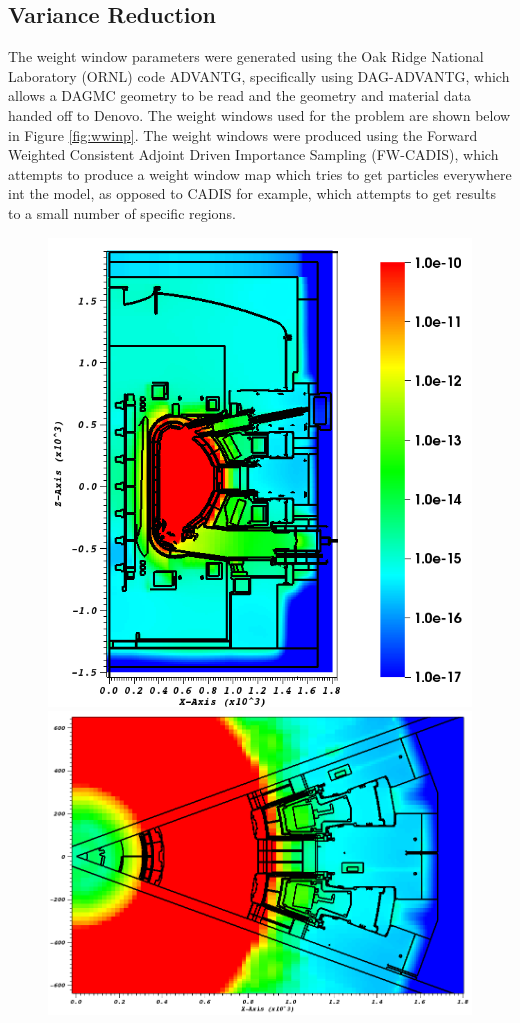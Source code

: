 \documentclass[12pt]{article}
\begin{document}
\subsection{Variance Reduction}
The weight window parameters were generated using the Oak Ridge National Laboratory (ORNL) code ADVANTG, specifically using DAG-ADVANTG, which allows a DAGMC geometry to be read and the geometry and material data handed off to Denovo. The weight windows used
for the problem are shown below in Figure \ref{fig:wwinp}. The weight windows were produced using the Forward Weighted Consistent Adjoint Driven Importance Sampling (FW-CADIS), which attempts to produce a weight window map which tries to get particles everywhere int the model, as opposed to CADIS for example, which attempts to get results to a small number of specific regions.
\begin{figure}[ht!]
  \centering
  \includegraphics[scale=0.4]{../plots/wwinp/wwinp_y0.png}
  \includegraphics[scale=0.3]{../plots/wwinp/wwinp_z0.png}

\end{figure}
\end{document}
